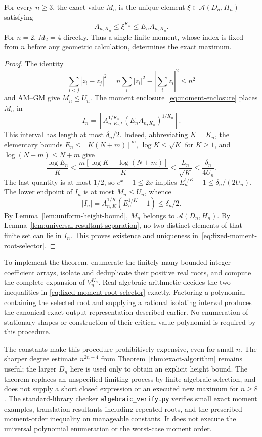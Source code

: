 \begin{theorem}
\label{thm:fixed-moment-reconstruction}
For every $n\ge3$, the exact value $M_n$ is the unique element
$\xi\in\mathcal A(D_n,H_n)$ satisfying
\begin{equation}\label{eq:fixed-moment-root-selector}
 \boxed{\qquad A_{n,K_n}\le\xi^{K_n}\le E_nA_{n,K_n}.\qquad}
\end{equation}
For $n=2$, $M_2=4$ directly.
Thus a single finite moment, whose index is fixed from $n$ before any
geometric calculation, determines the exact maximum.
\end{theorem}
\begin{proof}
The identity
\[
 \sum_{i<j}|z_i-z_j|^2
 =n\sum_i|z_i|^2-\left|\sum_i z_i\right|^2\le n^2
\]
and AM--GM give $M_n\le U_n$.
The moment enclosure~\eqref{eq:moment-enclosure} places $M_n$ in
\[
 I_n=[A_{n,K_n}^{1/K_n},(E_nA_{n,K_n})^{1/K_n}].
\]
This interval has length at most $\delta_n/2$. Indeed, abbreviating
$K=K_n$, the elementary bounds
$E_n\le[K(N+m)]^m$, $\log K\le\sqrt K$ for $K\ge1$, and
$\log(N+m)\le N+m$ give
\[
 \frac{\log E_n}{K}
 \le\frac{m[\log K+\log(N+m)]}{K}
 \le\frac{L_n}{\sqrt K}\le\frac{\delta_n}{4U_n}.
\]
The last quantity is at most $1/2$, so $e^x-1\le2x$ implies
$E_n^{1/K}-1\le\delta_n/(2U_n)$. The lower endpoint of $I_n$
is at most $M_n\le U_n$, whence
\[
 |I_n|=A_{n,K}^{1/K}(E_n^{1/K}-1)\le\delta_n/2.
\]
By Lemma~\ref{lem:uniform-height-bound}, $M_n$ belongs to
$\mathcal A(D_n,H_n)$. By
Lemma~\ref{lem:universal-resultant-separation}, no two distinct
elements of that finite set can lie in $I_n$. This proves existence
and uniqueness in~\eqref{eq:fixed-moment-root-selector}.
\end{proof}

To implement the theorem, enumerate the finitely many bounded integer
coefficient arrays, isolate and deduplicate their positive real roots,
and compute the complete expansion of $V_n^{K_n}$. Real algebraic
arithmetic decides the two inequalities in
\eqref{eq:fixed-moment-root-selector} exactly. Factoring a polynomial
containing the selected root and supplying a rational isolating
interval produces the canonical exact-output representation described
earlier. No enumeration of stationary shapes or construction of their
critical-value polynomial is required by this procedure.

The constants make this procedure prohibitively expensive, even for
small $n$. The sharper degree estimate $n^{2n-4}$ from
Theorem~\ref{thm:exact-algorithm} remains useful; the larger $D_n$ here
is used only to obtain an explicit height bound. The theorem replaces
an unspecified limiting process by finite algebraic selection, and
does not supply a short closed expression or an executed new maximum
for $n\ge8$. The standard-library checker
\texttt{algebraic\_verify.py} verifies small exact moment examples,
translation resultants including repeated roots, and the prescribed
moment-order inequality on manageable constants. It does not execute
the universal polynomial enumeration or the worst-case moment order.

